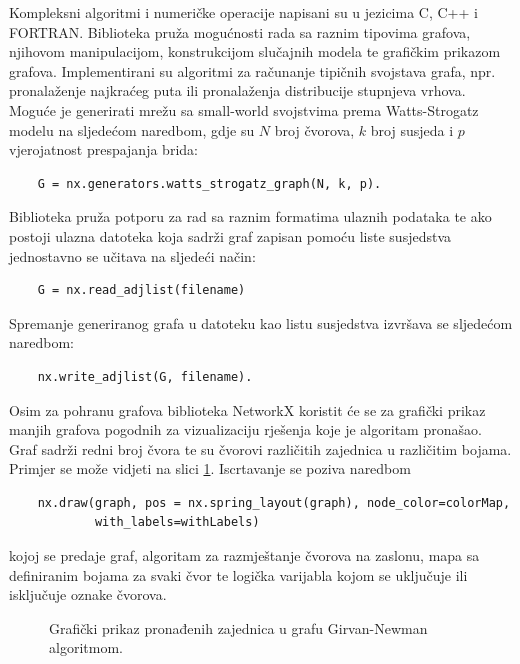 Kompleksni algoritmi i numeričke operacije napisani su u jezicima C, C++ i FORTRAN. Biblioteka pruža mogućnosti rada sa raznim tipovima grafova, njihovom manipulacijom, konstrukcijom slučajnih modela te grafičkim prikazom grafova. Implementirani su algoritmi za računanje tipičnih svojstava grafa, npr. pronalaženje najkraćeg puta ili pronalaženja distribucije stupnjeva vrhova. Moguće je generirati mrežu sa small-world svojstvima prema Watts-Strogatz modelu na sljedećom naredbom, gdje su $N$ broj čvorova, $k$ broj susjeda i $p$ vjerojatnost prespajanja brida:
\begin{verbatim}
	G = nx.generators.watts_strogatz_graph(N, k, p).
\end{verbatim}
Biblioteka pruža potporu za rad sa raznim formatima ulaznih podataka te ako postoji ulazna datoteka koja sadrži graf zapisan pomoću liste susjedstva jednostavno se učitava na sljedeći način: 
\begin{verbatim}
	G = nx.read_adjlist(filename)
\end{verbatim}
Spremanje generiranog grafa u datoteku kao listu susjedstva izvršava se sljedećom naredbom:
\begin{verbatim}
	nx.write_adjlist(G, filename).
\end{verbatim}

Osim za pohranu grafova biblioteka NetworkX koristit će se za grafički prikaz manjih grafova pogodnih za vizualizaciju rješenja koje je algoritam pronašao. Graf sadrži redni broj čvora te su čvorovi različitih zajednica u različitim bojama. Primjer se može vidjeti na slici \ref{fig:drawing}. Iscrtavanje se poziva naredbom
\begin{verbatim}
	nx.draw(graph, pos = nx.spring_layout(graph), node_color=colorMap,
			with_labels=withLabels)
\end{verbatim}
kojoj se predaje graf, algoritam za razmještanje čvorova na zaslonu, mapa sa definiranim bojama za svaki čvor te logička varijabla kojom se uključuje ili isključuje oznake čvorova. 

\begin{figure}
	\caption{Grafički prikaz pronađenih zajednica u grafu Girvan-Newman algoritmom.}
	\label{fig:drawing}
\end{figure}

